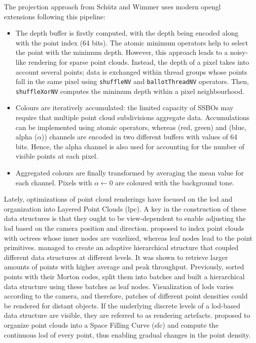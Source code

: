\begin{kaobox}[frametitle=Compute shader core proposed by Schütz and Wimmer]
The projection approach from Schütz and Wimmer \cite{schutz_rendering_2021} uses modern \acrshort{opengl} extensions following this pipeline:
\begin{itemize}
    \item The depth buffer is firstly computed, with the depth being encoded along with the point index (64 bits). The atomic minimum operators help to select the point with the minimum depth. However, this approach leads to a noisy-like rendering for sparse point clouds. Instead, the depth of a pixel takes into account several points; data is exchanged within thread groups whose points fall in the same pixel using \verb|shuffleNV| and \verb|ballotThreadNV| operators. Then, \verb|shuffleXorNV| computes the minimum depth within a pixel neighbourhood.
    \item Colours are iteratively accumulated: the limited capacity of SSBOs may require that multiple point cloud subdivisions aggregate data. Accumulations can be implemented using atomic operators, whereas (red, green) and (blue, alpha ($\alpha$)) channels are encoded in two different buffers with values of 64 bits. Hence, the alpha channel is also used for accounting for the number of visible points at each pixel.
    \item Aggregated colours are finally transformed by averaging the mean value for each channel. Pixels with $\alpha \gets 0$ are coloured with the background tone. 
\end{itemize}
\end{kaobox}

Lately, optimizations of point cloud renderings have focused on the \acrshort{lod} and organization into Layered Point Clouds (\acrshort{lpc}). A key in the construction of these data structures is that they ought to be view-dependent to enable adjusting the \acrshort{lod} based on the camera position and direction. \cite{schutz_gpu-accelerated_2023} proposed to index point clouds with octrees whose inner nodes are voxelized, whereas leaf nodes lead to the point primitives. \cite{ogayar-anguita_nested_2023} managed to create an adaptive hierarchical structure that coupled different data structures at different levels. It was shown to retrieve larger amounts of points with higher average and peak throughput. Previously, \cite{schutz_software_2022} sorted points with their Morton codes, split them into batches and built a hierarchical data structure using these batches as leaf nodes. Visualization of \acrshort{lod}s varies according to the camera, and therefore, patches of different point densities could be rendered for distant objects. If the underlying discrete levels of a \acrshort{lod}-based data structure are visible, they are referred to as rendering artefacts. \cite{van_oosterom_organizing_2022} proposed to organize point clouds into a Space Filling Curve (\acrshort{sfc}) and compute the continuous \acrshort{lod} of every point, thus enabling gradual changes in the point density. 


